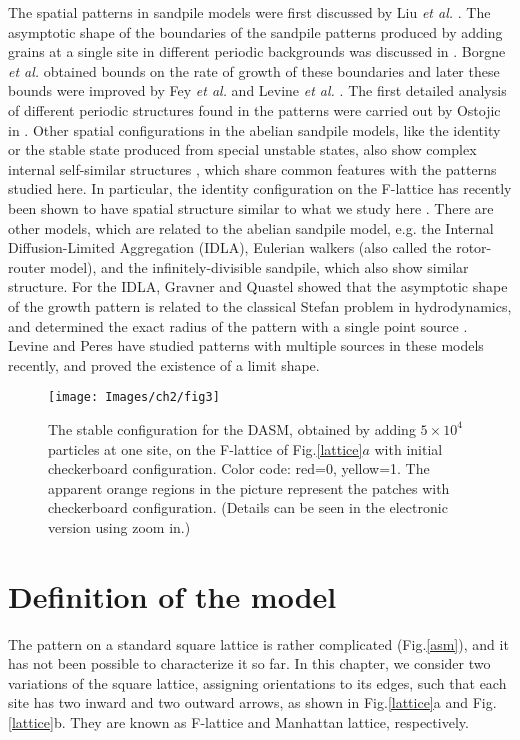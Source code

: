 \documentclass[11pt,a4paper]{book}
\begin{document}
The spatial patterns in
sandpile models were first discussed by Liu \textit{et al.} \cite{liu}. The asymptotic
shape  of the boundaries of the sandpile patterns produced by adding grains at 
a single site in different periodic backgrounds was discussed in \cite{dhar99}.
Borgne \textit{et al.} \cite{borgne} obtained bounds on the rate of growth of these boundaries
and later these bounds were improved by Fey \textit{et al.} \cite{redig} and
Levine \textit{et al.} \cite{lionel}. The first detailed analysis of different
periodic structures found in the patterns were carried out by Ostojic  in
\cite{ostojic}. Other spatial configurations in the abelian sandpile models, like the
identity \cite{borgne,identity,caracciolo} or the stable state produced
from special unstable states, also show complex internal self-similar structures
\cite{liu}, which share common features with the patterns studied here. In particular, the 
identity configuration on the F-lattice has recently been shown to have 
spatial structure similar to what we study here \cite{caracciolo}.
There are other models, which are related to the abelian sandpile model, e.g.
the Internal Diffusion-Limited Aggregation (IDLA), Eulerian walkers (also called
the rotor-router model), and the infinitely-divisible sandpile, which  also show
similar structure. For the IDLA,  Gravner and Quastel showed that the
asymptotic shape of the growth pattern is related to the classical Stefan
problem in hydrodynamics, and determined the exact radius of the pattern with
a single point source \cite{gravner}. Levine and Peres have studied patterns
with multiple sources in these models recently, and proved the existence
of a limit shape\cite{levine_peres}.
\begin{figure}
  \begin{center}
  \texttt{[image: Images/ch2/fig3]}
  \caption{The stable configuration for the DASM, obtained 
  by adding $5\times10^4$ particles at one site, on the F-lattice of Fig.\ref{lattice}$a$ with initial 
  checkerboard configuration. Color code: 
  red=0, yellow=1. The apparent orange regions in the picture represent the
  patches with checkerboard configuration. (Details can be seen in the electronic version using zoom in.)}
  \label{flattice}
  \end{center}
\end{figure}

\section{Definition of the model}
The pattern on a standard square lattice is rather complicated
(Fig.\ref{asm}), and it has not been possible to characterize 
it so far. In this chapter, we consider two variations of the square
lattice, assigning orientations to 
its edges, such that each site has two inward
and two outward arrows, as shown in Fig.\ref{lattice}a and
Fig.\ref{lattice}b. They are known as F-lattice and Manhattan lattice, respectively.
\end{document}
